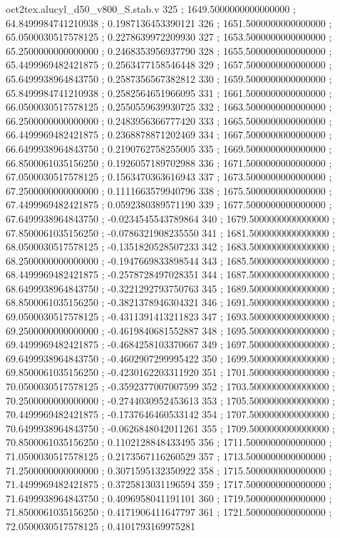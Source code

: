 \begin{filecontents}[overwrite]{oct2tex.alucyl_d50_v800_S.stab.v}
325 ; 1649.5000000000000000 ; 64.8499984741210938 ; 0.1987136453390121
326 ; 1651.5000000000000000 ; 65.0500030517578125 ; 0.2278639972209930
327 ; 1653.5000000000000000 ; 65.2500000000000000 ; 0.2468353956937790
328 ; 1655.5000000000000000 ; 65.4499969482421875 ; 0.2563477158546448
329 ; 1657.5000000000000000 ; 65.6499938964843750 ; 0.2587356567382812
330 ; 1659.5000000000000000 ; 65.8499984741210938 ; 0.2582564651966095
331 ; 1661.5000000000000000 ; 66.0500030517578125 ; 0.2550559639930725
332 ; 1663.5000000000000000 ; 66.2500000000000000 ; 0.2483956366777420
333 ; 1665.5000000000000000 ; 66.4499969482421875 ; 0.2368878871202469
334 ; 1667.5000000000000000 ; 66.6499938964843750 ; 0.2190762758255005
335 ; 1669.5000000000000000 ; 66.8500061035156250 ; 0.1926057189702988
336 ; 1671.5000000000000000 ; 67.0500030517578125 ; 0.1563470363616943
337 ; 1673.5000000000000000 ; 67.2500000000000000 ; 0.1111663579940796
338 ; 1675.5000000000000000 ; 67.4499969482421875 ; 0.0592380389571190
339 ; 1677.5000000000000000 ; 67.6499938964843750 ; -0.0234545543789864
340 ; 1679.5000000000000000 ; 67.8500061035156250 ; -0.0786321908235550
341 ; 1681.5000000000000000 ; 68.0500030517578125 ; -0.1351820528507233
342 ; 1683.5000000000000000 ; 68.2500000000000000 ; -0.1947669833898544
343 ; 1685.5000000000000000 ; 68.4499969482421875 ; -0.2578728497028351
344 ; 1687.5000000000000000 ; 68.6499938964843750 ; -0.3221292793750763
345 ; 1689.5000000000000000 ; 68.8500061035156250 ; -0.3821378946304321
346 ; 1691.5000000000000000 ; 69.0500030517578125 ; -0.4311391413211823
347 ; 1693.5000000000000000 ; 69.2500000000000000 ; -0.4619840681552887
348 ; 1695.5000000000000000 ; 69.4499969482421875 ; -0.4684258103370667
349 ; 1697.5000000000000000 ; 69.6499938964843750 ; -0.4602907299995422
350 ; 1699.5000000000000000 ; 69.8500061035156250 ; -0.4230162203311920
351 ; 1701.5000000000000000 ; 70.0500030517578125 ; -0.3592377007007599
352 ; 1703.5000000000000000 ; 70.2500000000000000 ; -0.2744030952453613
353 ; 1705.5000000000000000 ; 70.4499969482421875 ; -0.1737646460533142
354 ; 1707.5000000000000000 ; 70.6499938964843750 ; -0.0626848042011261
355 ; 1709.5000000000000000 ; 70.8500061035156250 ; 0.1102128848433495
356 ; 1711.5000000000000000 ; 71.0500030517578125 ; 0.2173567116260529
357 ; 1713.5000000000000000 ; 71.2500000000000000 ; 0.3071595132350922
358 ; 1715.5000000000000000 ; 71.4499969482421875 ; 0.3725813031196594
359 ; 1717.5000000000000000 ; 71.6499938964843750 ; 0.4096958041191101
360 ; 1719.5000000000000000 ; 71.8500061035156250 ; 0.4171906411647797
361 ; 1721.5000000000000000 ; 72.0500030517578125 ; 0.4101793169975281

\end{filecontents}
